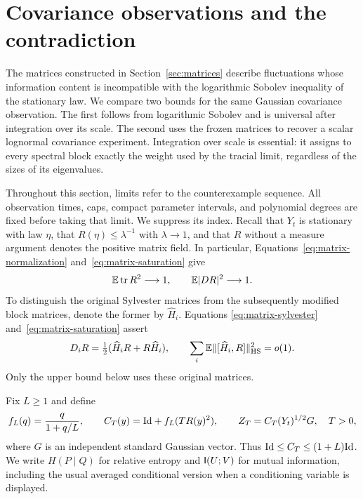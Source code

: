 \section{Covariance observations and the contradiction}
\label{sec:observations}

The matrices constructed in Section~\ref{sec:matrices} describe fluctuations
whose information content is incompatible with the logarithmic Sobolev
inequality of the stationary law.  We compare two bounds for the same
Gaussian covariance observation.  The first follows from logarithmic
Sobolev and is universal after integration over its scale.  The second
uses the frozen matrices to recover a scalar lognormal covariance
experiment.  Integration over scale is essential: it assigns to every
spectral block exactly the weight used by the tracial limit, regardless
of the sizes of its eigenvalues.

Throughout this section, limits refer to the counterexample sequence.
All observation times, caps, compact parameter intervals, and polynomial
degrees are fixed before taking that limit.  We suppress its index.
Recall that $Y_t$ is stationary with law $\eta$, that
$R(\eta)\le\lambda^{-1}$ with $\lambda\to1$, and that $R$ without a
measure argument denotes the positive matrix field.  In particular,
Equations~\eqref{eq:matrix-normalization}
and~\eqref{eq:matrix-saturation} give
\begin{equation}\label{eq:obs-energy-input}
 \mathbb E\operatorname{tr} R^2\longrightarrow1,
 \qquad \mathbb E|DR|^2\longrightarrow1.
\end{equation}
To distinguish the original Sylvester matrices from the subsequently
modified block matrices, denote the former by $\widehat H_i$.  Equations
\eqref{eq:matrix-sylvester} and~\eqref{eq:matrix-saturation} assert
\begin{equation}\label{eq:obs-sylvester-input}
 D_iR=\tfrac12(\widehat H_iR+R\widehat H_i),
 \qquad
 \sum_i\mathbb E\|[\widehat H_i,R]\|_{\mathrm{HS}}^2=o(1).
\end{equation}
Only the upper bound below uses these original matrices.

Fix $L\ge1$ and define
\begin{equation}\label{eq:obs-covariance-definition}
 f_L(q)=\frac{q}{1+q/L},\qquad
 C_T(y)=\mathrm{Id}+f_L(TR(y)^2),\qquad
 Z_T=C_T(Y_t)^{1/2}G,\quad T>0,
\end{equation}
where $G$ is an independent standard Gaussian vector.  Thus
$\mathrm{Id}\le C_T\le(1+L)\mathrm{Id}$.  We write $H(P\mid Q)$ for relative entropy
and $\mathsf I(U;V)$ for mutual information, including the usual averaged
conditional version when a conditioning variable is displayed.

